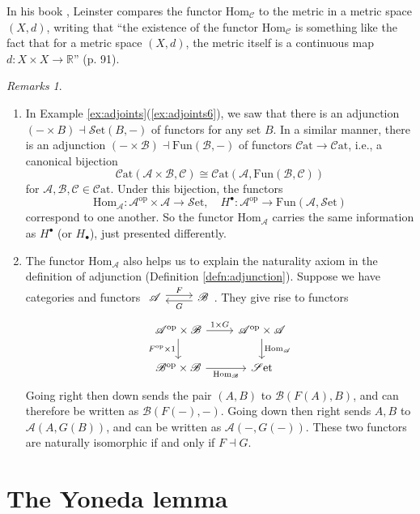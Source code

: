 \documentclass[10pt,oneside]{book}
\def\~#1{\mathscr{#1}}
\newcommand{\R}{\mathbb{R}}
\newcommand{\op}{\mathrm{op}}
\newcommand{\Hom}{\mathrm{Hom}}
\newcommand{\Fun}{\mathrm{Fun}}
\newcommand{\Set}{\~S\mathrm{et}}
\newcommand{\Cat}{\~C\mathrm{at}}
\theoremstyle{plain}
\theoremstyle{definition}
\theoremstyle{remark}
\newtheorem*{rmks}{Remarks}
\numberwithin{equation}{section}
\numberwithin{figure}{section}
\begin{document}
In his book \cite{leinster2016}, Leinster compares the functor $\Hom_\~C$ to the metric in a metric space $(X, d)$, writing that ``the existence of the functor $\Hom_\~C$ is something like the fact that for a metric space $(X, d)$, the metric itself is a continuous map $d: X \times X \to \R$'' (p. 91).
\begin{rmks}
\hfill
\begin{enumerate}[label=(\roman*)]
    \item In Example \ref{ex:adjoints}(\ref{ex:adjoints6}), we saw that there is an adjunction $(- \times B) \dashv \Set(B, -)$ of functors for any set $B$. In a similar manner, there is an adjunction $(-\times \~B) \dashv \Fun(\~B, -)$ of functors $\Cat \to \Cat$, i.e., a canonical bijection
    \[\Cat(\~A \times \~B, \~C) \cong \Cat(\~A, \Fun(\~B, \~C))\]
    for $\~A, \~B, \~C \in \Cat$. Under this bijection, the functors 
    \[\Hom_\~A : \~A^\op \times \~A \to \Set, \quad H^\bullet: \~A^\op \to \Fun(\~A, \Set)\]
    correspond to one another. So the functor $\Hom_\~A$ carries the same information as $H^\bullet$ (or $H_\bullet$), just presented differently. 

    \item The functor $\Hom_\~A$ also helps us to explain the naturality axiom in the definition of adjunction (Definition \ref{defn:adjunction}). Suppose we have categories and functors $\begin{tikzcd}
    {\~A} & {\~B}
    \arrow["F", shift left, from=1-1, to=1-2]
    \arrow["G", shift left, from=1-2, to=1-1]
\end{tikzcd}$. They give rise to functors 
\[\begin{tikzcd}
    {\~A^\op \times \~B} & {\~A^\op \times \~A} \\
    {\~B^\op \times \~B} & \Set
    \arrow["{1 \times G}", from=1-1, to=1-2]
    \arrow["{F^\op \times 1}"', from=1-1, to=2-1]
    \arrow["{\Hom_\~A}", from=1-2, to=2-2]
    \arrow["{\Hom_\~B}"', from=2-1, to=2-2]
\end{tikzcd}\]
Going right then down sends the pair $(A, B)$ to $\~B(F(A), B)$, and can therefore be written as $\~B(F(-), -)$. Going down then right sends $A, B$ to $\~A(A, G(B))$, and can be written as $\~A(-,G(-))$. These two functors are naturally isomorphic if and only if $F \dashv G$.
\end{enumerate}
\end{rmks}

\section{The Yoneda lemma}
\end{document}
